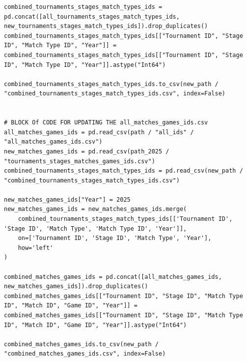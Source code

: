\begin{lstlisting}[style=code,caption={Function for updating the dataset to include 2025 statistics.},label={lst:updateDataset}]
combined_tournaments_stages_match_types_ids = pd.concat([all_tournaments_stages_match_types_ids, new_tournaments_stages_match_types_ids]).drop_duplicates()
combined_tournaments_stages_match_types_ids[["Tournament ID", "Stage ID", "Match Type ID", "Year"]] = combined_tournaments_stages_match_types_ids[["Tournament ID", "Stage ID", "Match Type ID", "Year"]].astype("Int64")

combined_tournaments_stages_match_types_ids.to_csv(new_path / "combined_tournaments_stages_match_types_ids.csv", index=False)


# BLOCK Of CODE FOR UPDATING THE all_matches_games_ids.csv
all_matches_games_ids = pd.read_csv(path / "all_ids" / "all_matches_games_ids.csv")
new_matches_games_ids = pd.read_csv(path_2025 / "tournaments_stages_matches_games_ids.csv")
combined_tournaments_stages_match_types_ids = pd.read_csv(new_path / "combined_tournaments_stages_match_types_ids.csv")

new_matches_games_ids["Year"] = 2025
new_matches_games_ids = new_matches_games_ids.merge(
    combined_tournaments_stages_match_types_ids[['Tournament ID', 'Stage ID', 'Match Type', 'Match Type ID', 'Year']], 
    on=['Tournament ID', 'Stage ID', 'Match Type', 'Year'], 
    how='left'
)

combined_matches_games_ids = pd.concat([all_matches_games_ids, new_matches_games_ids]).drop_duplicates()
combined_matches_games_ids[["Tournament ID", "Stage ID", "Match Type ID", "Match ID", "Game ID", "Year"]] = combined_matches_games_ids[["Tournament ID", "Stage ID", "Match Type ID", "Match ID", "Game ID", "Year"]].astype("Int64")

combined_matches_games_ids.to_csv(new_path / "combined_matches_games_ids.csv", index=False)
\end{lstlisting}

